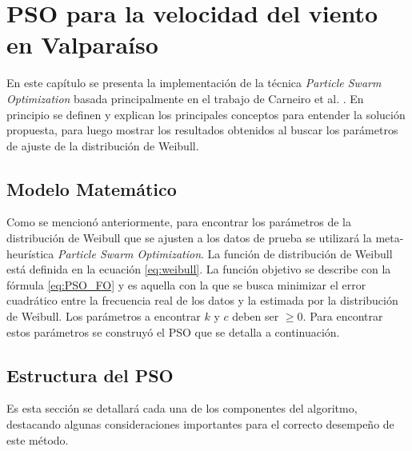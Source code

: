 
\chapter{PSO para la velocidad del viento en Valparaíso}
En este capítulo se presenta la implementación de la técnica \emph{Particle Swarm Optimization} basada principalmente en el trabajo de Carneiro et al. \cite{Carneiro15}. En principio se definen y explican los principales conceptos para entender la solución propuesta, para luego mostrar los resultados obtenidos al buscar los parámetros de ajuste de la distribución de Weibull.

\section{Modelo Matemático} \label{ss:Modelo_Mat}
Como se mencionó anteriormente, para encontrar los parámetros de la distribución de Weibull que se ajusten a los datos de prueba se utilizará la meta-heurística \emph{Particle Swarm Optimization}. La función de distribución de Weibull está definida en la ecuación \ref{eq:weibull}. La función objetivo se describe con la fórmula \ref{eq:PSO_FO} y es aquella con la que se busca minimizar el error cuadrático entre la frecuencia real de los datos y la estimada por la distribución de Weibull. Los parámetros a encontrar $k$ y $c$ deben ser $\geq 0$. Para encontrar estos parámetros se construyó el PSO que se detalla a continuación.

\section{Estructura del PSO}
Es esta sección se detallará cada una de los componentes del algoritmo, destacando algunas consideraciones importantes para el correcto desempeño de este método.
